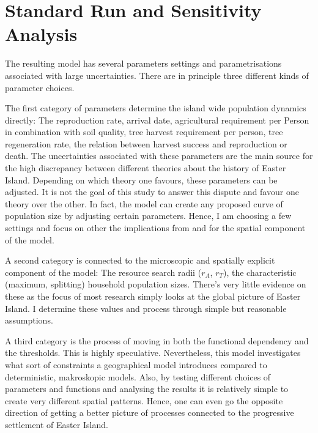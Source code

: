 		
		
\section{Standard Run and Sensitivity Analysis}
The resulting model has several parameters settings and parametrisations associated with large uncertainties. 
There are in principle three different kinds of parameter choices.

The first category of parameters determine the island wide population dynamics directly: 
The reproduction rate, arrival date, agricultural requirement per Person in combination with soil quality, tree harvest requirement per person, tree regeneration rate, the relation between harvest success and reproduction or death.
The uncertainties associated with these parameters are the main source for the high 
discrepancy between different theories about the history of Easter Island.
Depending on which theory one favours, these parameters can be adjusted.
It is not the goal of this study to answer this dispute and favour one theory over the other.
In fact, the model can create any proposed curve of population size by adjusting certain parameters.
Hence, I am choosing a few settings and focus on other the implications from and for the spatial component of the model.

A second category is connected to the microscopic and spatially explicit component of the model:
The resource search radii ($r_A$, $r_T$), the characteristic (maximum, splitting) household population sizes. 
There's very little evidence on these as the focus of most research simply looks at the global picture of Easter Island. 
I determine these values and process through simple but reasonable assumptions.

A third category is the process of moving in both the functional dependency and the thresholds.
This is highly speculative.
Nevertheless, this model investigates what sort of constraints a geographical model introduces compared to deterministic, makroskopic models.
Also, by testing different choices of parameters and functions and analysing the results it is relatively simple to create very different spatial patterns.
Hence, one can even go the opposite direction of getting a better picture of processes connected to the progressive settlement of Easter Island.





